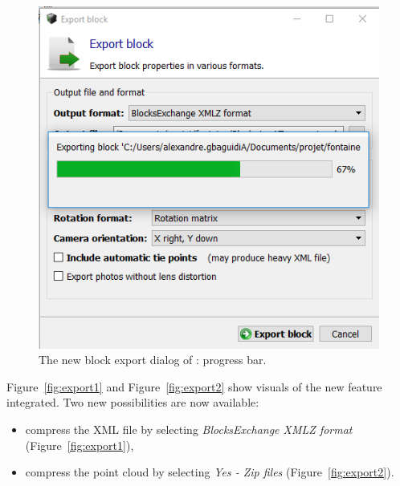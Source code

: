 \begin{figure}
  \centering
  \includegraphics[scale=0.7]{img/export3.png}
  \caption{The new block export dialog of \CC: progress bar.}
  \label{fig:export3}
\end{figure}

Figure~\ref{fig:export1} and Figure~\ref{fig:export2} show visuals of the new feature integrated. Two new possibilities are now available:
\begin{itemize}
\item compress the XML file by selecting \emph{BlocksExchange XMLZ format} (Figure~\ref{fig:export1}),
\item compress the point cloud by selecting \emph{Yes - Zip files} (Figure~\ref{fig:export2}).
\end{itemize}
